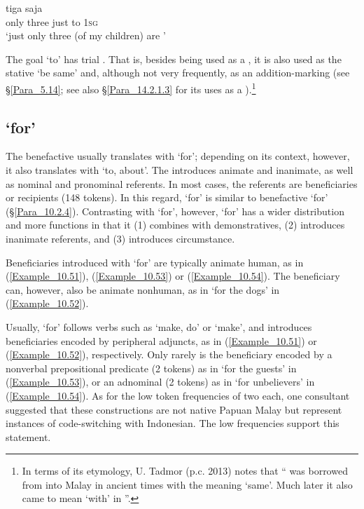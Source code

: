 \ea
\label{Example_10.50}
 {tiga} {saja} {} {}\\ %
 only  three  just  to  \textsc{1sg}\\
\glt 
‘just only three (of my children) are ’ \textstyleExampleSource{[081006-024-CvEx.0001]}
\z


The goal   ‘to’ has trial . That is, besides being used as a , it is also used as the stative   ‘be same’ and, although not very frequently, as an addition-marking  (see §\ref{Para_5.14}; see also §\ref{Para_14.2.1.3} for its uses as a ).\footnote{\label{Footnote_10.225} In terms of its etymology, U. Tadmor (p.c. 2013) notes that “\textit{ }was borrowed from  into Malay in ancient times with the meaning ‘same’. Much later it also came to mean ‘with’ in ”.}


\subsection{ ‘for’}
\label{Para_10.2.3}
The benefactive   usually translates with ‘for’; depending on its context, however, it also translates with ‘to, about’. The  introduces animate and inanimate, as well as nominal and pronominal referents. In most cases, the referents are beneficiaries or recipients (148 tokens). In this regard,  ‘for’ is similar to benefactive  ‘for’ (§\ref{Para_10.2.4}). Contrasting with  ‘for’, however,  ‘for’ has a wider distribution and more functions in that it (1) combines with demonstratives, (2) introduces inanimate referents, and (3) introduces circumstance.



Beneficiaries introduced with  ‘for’ are typically animate human, as in (\ref{Example_10.51}), (\ref{Example_10.53}) or (\ref{Example_10.54}). The beneficiary can, however, also be animate nonhuman, as in  ‘for the dogs’ in (\ref{Example_10.52}).



Usually,  ‘for’ follows  verbs such as  ‘make, do’ or  ‘make’, and introduces beneficiaries encoded by peripheral adjuncts, as in (\ref{Example_10.51}) or (\ref{Example_10.52}), respectively. Only rarely is the beneficiary encoded by a nonverbal prepositional predicate (2 tokens) as in  ‘for the guests’ in (\ref{Example_10.53}), or an adnominal  (2 tokens) as in  ‘for unbelievers’ in (\ref{Example_10.54}). As for the low token frequencies of two each, one consultant suggested that these constructions are not native Papuan Malay but represent instances of code-switching with Indonesian. The low frequencies support this statement.


